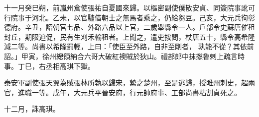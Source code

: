 \begin{pinyinscope}
 十一月癸巳朔，前嵐州倉使張祐自夏國來歸。以樞密副使僕散安貞、同簽院事訛可行院事于河北。乙未，以官驢借朝士之無馬者乘之，仍給芻豆。己亥，大元兵徇彰德府。辛丑，詔朝官七品、外路六品以上官，二歲舉縣令一人。戶部令史蘇唐催租封丘，期限迫促，民有生刈禾輸租者。上聞之，遣吏按問，杖唐五十，縣令高希隆減二等。尚書以希隆罰輕，上曰：「使臣至外路，自非至剛者，
 孰能不從？其依前詔。」甲寅，徐州總領納合六哥大破紅襖賊於狄山。禮部郎中抹撚魯剌上疏言時事。丁巳，右丞相高琪下獄。



 泰安軍副使張天翼為賊張林所執以歸宋，縶之楚州，至是逃歸，授睢州刺史，超兩官，進職一等。戊午，大元兵平晉安府，行元帥府事、工部尚書粘割貞死之。



 十二月，誅高琪。



\end{pinyinscope}